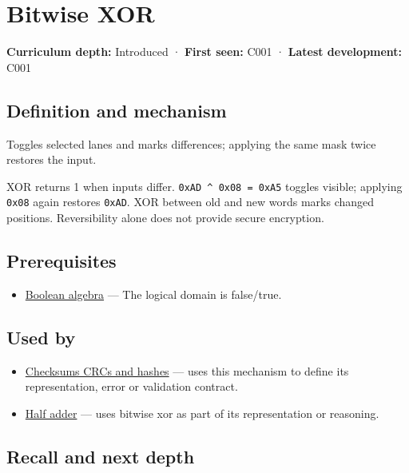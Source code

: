 \hypertarget{appendix-d49161831368}{}\label{referencestart:appendix-d49161831368}
\section{Bitwise XOR}\label{appendix-d49161831368-bitwise-xor}

\textbf{Curriculum depth:} Introduced · \textbf{First seen:} C001 · \textbf{Latest development:} C001

\subsection{Definition and mechanism}\label{appendix-d49161831368-definition-and-mechanism}

Toggles selected lanes and marks differences; applying the same mask twice restores the input.

XOR returns 1 when inputs differ. \texttt{0xAD\ \^{}\ 0x08\ =\ 0xA5} toggles visible; applying \texttt{0x08} again restores \texttt{0xAD}. XOR between old and new words marks changed positions. Reversibility alone does not provide secure encryption.

\subsection{Prerequisites}\label{appendix-d49161831368-prerequisites}

\begin{itemize}
\tightlist
\item
  \hyperref[appendix-24475e1596a8]{Boolean algebra} --- The logical domain is false/true.
\end{itemize}

\subsection{Used by}\label{appendix-d49161831368-used-by}

\begin{itemize}
\item
  \hyperref[appendix-ed338677de0a]{Checksums CRCs and hashes} --- uses this mechanism to define its representation, error or validation contract.
\item
  \hyperref[appendix-1652d27a8e90]{Half adder} --- uses bitwise xor as part of its representation or reasoning.
\end{itemize}

\subsection{Recall and next depth}\label{appendix-d49161831368-recall-and-next-depth}


